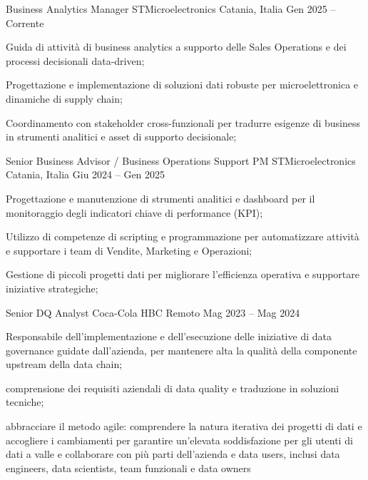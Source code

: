 
  \begin{cventries}
    \cventry
    {Business Analytics Manager}
    {STMicroelectronics}
    {Catania, Italia}
    {Gen 2025 -- Corrente}
    {
      \begin{cvitems}
        \item {Guida di attività di business analytics a supporto delle Sales Operations e dei processi decisionali data-driven;}
        \item {Progettazione e implementazione di soluzioni dati robuste per microelettronica e dinamiche di supply chain;}
        \item {Coordinamento con stakeholder cross-funzionali per tradurre esigenze di business in strumenti analitici e asset di supporto decisionale;}
      \end{cvitems}
    }

    \cventry
    {Senior Business Advisor / Business Operations Support PM}
    {STMicroelectronics}
    {Catania, Italia}
    {Giu 2024 -- Gen 2025}
    {
      \begin{cvitems}
        \item {Progettazione e manutenzione di strumenti analitici e dashboard per il monitoraggio degli indicatori chiave di performance (KPI);}
        \item {Utilizzo di competenze di scripting e programmazione per automatizzare attività e supportare i team di Vendite, Marketing e Operazioni;}
        \item {Gestione di piccoli progetti dati per migliorare l'efficienza operativa e supportare iniziative strategiche;}
      \end{cvitems}
    }
    

    \cventry
    {Senior DQ Analyst}
    {Coca-Cola HBC}
    {Remoto}
    {Mag 2023 -- Mag 2024}
    {
      \begin{cvitems}
        \item {Responsabile dell'implementazione e dell'esecuzione delle iniziative di data governance guidate dall'azienda,
        per mantenere alta la qualità della componente upstream della data chain;}
        \item{comprensione dei requisiti aziendali di data quality e traduzione in soluzioni tecniche;}
        \item{abbracciare il metodo agile: comprendere la natura iterativa dei progetti di dati e accogliere i cambiamenti per garantire un'elevata soddisfazione per gli utenti di dati a valle e collaborare con più parti dell'azienda e data users, inclusi data engineers, data scientists, team funzionali e data owners}
      \end{cvitems}
    }


\end{cventries}
